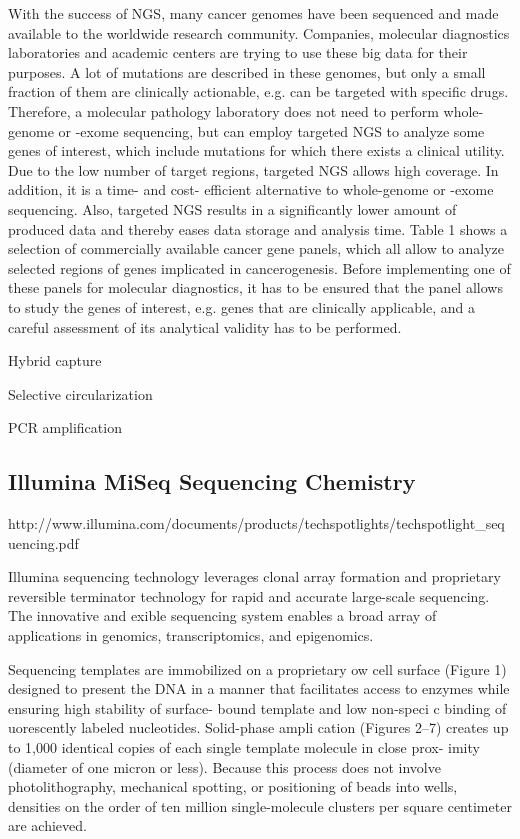With the success of NGS, many cancer genomes have been sequenced and made available to the worldwide research community. Companies, molecular diagnostics laboratories and academic centers are trying to use these big data for their purposes. A lot of mutations are described in these genomes, but only a small fraction of them are clinically actionable, e.g. can be targeted with specific drugs. Therefore, a molecular pathology laboratory does not need to perform whole-genome or -exome sequencing, but can employ targeted NGS to analyze some genes of interest, which include mutations for which there exists a clinical utility. Due to the low number of target regions, targeted NGS allows high coverage. In addition, it is a time- and cost- efficient alternative to whole-genome or -exome sequencing. Also, targeted NGS results in a significantly lower amount of produced data and thereby eases data storage and analysis time. Table 1 shows a selection of commercially available cancer gene panels, which all allow to analyze selected regions of genes implicated in cancerogenesis. Before implementing one of these panels for molecular diagnostics, it has to be ensured that the panel allows to study the genes of interest, e.g. genes that are clinically applicable, and a careful assessment of its analytical validity has to be performed.

Hybrid capture

Selective circularization

PCR amplification

\subsection{Illumina MiSeq Sequencing Chemistry}

http://www.illumina.com/documents/products/techspotlights/techspotlight_sequencing.pdf

Illumina sequencing technology leverages clonal array formation and proprietary reversible terminator technology for rapid and accurate large-scale sequencing. The innovative and  exible sequencing system enables a broad array of applications in genomics, transcriptomics, and epigenomics.

Sequencing templates are immobilized on a proprietary  ow cell surface (Figure 1) designed to present the DNA in a manner that facilitates access to enzymes while ensuring high stability of surface- bound template and low non-speci c binding of  uorescently labeled nucleotides. Solid-phase ampli cation (Figures 2–7) creates up to 1,000 identical copies of each single template molecule in close prox- imity (diameter of one micron or less). Because this process does not involve photolithography, mechanical spotting, or positioning of beads into wells, densities on the order of ten million single-molecule clusters per square centimeter are achieved.


